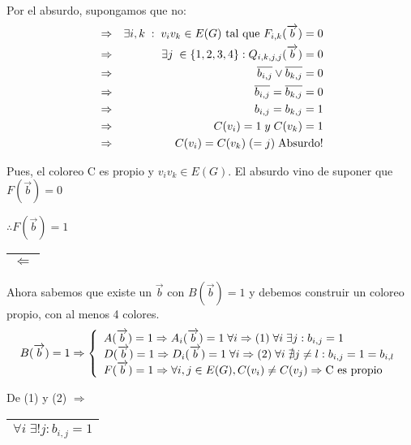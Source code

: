 \documentclass[12pt,a4paper]{report}
\newcounter{neq}
\begin{document}
					\par Por el absurdo, supongamos que no:
					\begin{eqnarray}
						\nonumber &\Rightarrow & \exists i, k \; : \; v_{i} v_{k} \in E(G) \textup{ tal que } F_{i, k}(\overrightarrow{b}) = 0 \\
						\nonumber &\Rightarrow & \exists j \; \in \lbrace 1, 2, 3, 4 \rbrace : Q_{i, k, j, j}(\overrightarrow{b}) = 0 \\
						\nonumber &\Rightarrow & \overline{b_{i, j}} \vee \overline{b_{k, j}} = 0 \\
						\nonumber &\Rightarrow & \overline{b_{i, j}} = \overline{b_{k, j}} = 0 \\
						\nonumber &\Rightarrow & b_{i, j} = b_{k, j} = 1 \\
						\nonumber &\Rightarrow & C(v_{i}) = 1\; y \; C(v_{k}) = 1\\
						\nonumber &\Rightarrow & C(v_{i}) = C(v_{k}) \; (= j) \; \textup{Absurdo!}
					\end{eqnarray}
					\par Pues, el coloreo C es propio y $v_{i} v_{k} \in E(G)$. El absurdo vino de suponer que $F(\overrightarrow{b}) = 0$

					\vspace{3mm}
					\par $\therefore F(\overrightarrow{b}) = 1$

			\vspace{5mm}
			\begin{tabular}{|c|} \hline $\Leftarrow$ \\ \hline \end{tabular}

				\par Ahora sabemos que existe un $\overrightarrow{b}$ con $B(\overrightarrow{b}) = 1$ y debemos construir un coloreo propio, con al menos 4 colores.
				\begin{equation*}
					B(\overrightarrow{b}) = 1\Rightarrow
		  			\left \lbrace
		  			\begin{array}{l}
		    		 A(\overrightarrow{b}) = 1 \Rightarrow A_{i}(\overrightarrow{b}) = 1 \; \forall i \Rightarrow  (1) \; \forall i \; \exists j : b_{i, j}  = 1 \\
		     		 D(\overrightarrow{b}) = 1 \Rightarrow D_{i}(\overrightarrow{b}) = 1 \; \forall i \Rightarrow  (2) \;  \forall i \; \nexists j \neq l : b_{i, j}  = 1 = b_{i, l} \\
		     		 F(\overrightarrow{b}) = 1 \Rightarrow \forall i, j \in E(G), C(v_{i}) \neq C(v_{j}) \Rightarrow \textup{C es propio}
		  			\end{array}
		  			\right.
				\end{equation*}
				\par De (1) y (2) $\Rightarrow$ \begin{tabular}{|c|} \hline $\forall i \; \exists ! j : b_{i, j} = 1$ \\ \hline \end{tabular}
\end{document}

